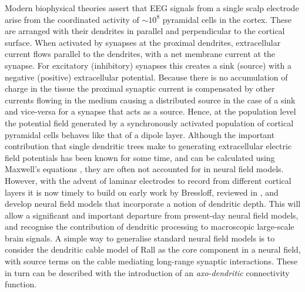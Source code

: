 \documentclass[a4paper,final]{siamart190516}
\begin{document}
Modern biophysical theories assert that EEG signals from a single scalp
electrode arise from the coordinated activity of $\sim 10^8$ pyramidal cells in the
cortex.  These are arranged with their dendrites in parallel and perpendicular to the
cortical surface. When activated by synapses at the proximal
dendrites, extracellular current flows parallel to the dendrites, with a net
membrane current at the synapse. For excitatory (inhibitory) synapses this creates a
sink (source) with a negative (positive) extracellular potential.  Because there is
no accumulation of charge in the tissue the proximal synaptic current is compensated
by other currents flowing in the medium causing a distributed source in the case of a
sink and vice-versa for a synapse that acts as a source. Hence, at the population
level the potential field generated by a synchronously activated population of
cortical pyramidal cells behaves like that of a dipole layer.  Although the important
contribution that single dendritic trees make to generating extracellular electric
field potentials has been known for some time, and can be calculated using
Maxwell's equations \cite{Pettersen08}, they are often not accounted for in neural
field models.  However, with the advent of laminar electrodes to record from
different cortical layers it is now timely to build on early work by Bressloff,
reviewed in \cite{Bressloff97}, and develop neural field models that incorporate a
notion of dendritic depth.  This will allow a significant and important departure
from present-day neural field models, and recognise the contribution of dendritic
processing to macroscopic large-scale brain signals. A simple way to generalise
standard neural field models is to consider the dendritic cable model of Rall as the
core component in a neural field, with source terms on the cable mediating
long-range synaptic interactions.  These in turn can be described with the
introduction of an \textit{axo-dendritic} connectivity function.
\end{document}
